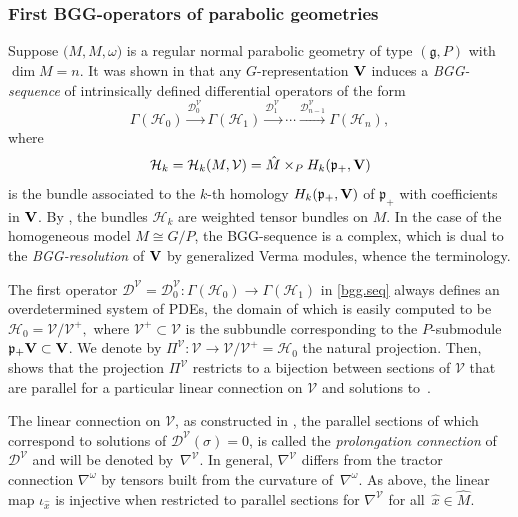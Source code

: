 \documentclass[10pt,a4paper]{amsart}
\numberwithin{equation}{section}
\theoremstyle{definition}
\newcommand{\cV}{{\mathcal V}}
\def\g{{\mathfrak g}}
\def\p{{\mathfrak p}}
\begin{document}
\subsubsection{First BGG-operators of parabolic geometries}\label{sec_BGG}
Suppose $\bigl(M,\hat{M},\omega\bigr)$ is a regular normal parabolic geometry of type $(\g,P)$ with $\dim M=n$. It was shown in \cite{CD.BGG, css.bgg.seqs} that any $G$-representation ${\bf V}$ induces a \emph{BGG-sequence}
of intrinsically defined differential operators of the form
\begin{equation}\label{bgg.seq}
 \Gamma(\mathcal H_0)\stackrel{\mathcal D^{\mathcal V}_0\ }{\rightarrow}\Gamma(\mathcal H_1)\overset{\mathcal D^{\mathcal V}_1\ }{\rightarrow}\cdots
 \overset{\mathcal D^{\mathcal V}_{n-1}}{\rightarrow}\Gamma(\mathcal H_{n}),
 \end{equation}
 where \[\mathcal H_k = \mathcal H_k(M,\mathcal V)=\hat{M}\times_P H_k(\p_+,{\bf V})\] is the bundle associated to the $k$-th homology $H_k(\p_+,{\bf V})$ of $\p_+$ with coefficients in ${\bf V}$. By \cite{kostant.harmonic.curv},
 the bundles $\mathcal H_k$ are weighted tensor bundles on $M$. In the case of the homogeneous model $M \cong G/P$, the BGG-sequence is a complex, which is dual to the \emph{BGG-resolution} of ${\bf V}$ by generalized Verma modules, whence the terminology.

 The first operator $\mathcal D^{\mathcal V} =\mathcal D^{\mathcal V}_0\colon \Gamma(\mathcal H_0)\rightarrow \Gamma(\mathcal H_1)$ in \eqref{bgg.seq} always defines an overdetermined system of PDEs, the
 domain of which is easily computed to be $\mathcal H_0=\mathcal V/\mathcal V^+,$ where $\mathcal V^+ \subset \mathcal V$ is the subbundle corresponding to the $P$-submodule $\p_+{\bf V} \subset {\bf V}$.
 We denote by $\Pi^\mathcal V\colon \mathcal V\rightarrow \mathcal V/\mathcal V^+=\mathcal H_0$ the natural projection. Then, \cite{hsss.prol.connxn, neuss.prolong} shows that the projection $\Pi^\mathcal V$ restricts to a bijection between
 sections of $\mathcal V$ that are parallel for a particular linear connection on $\cV$ and solutions to~.

 The linear connection on $\mathcal V$, as constructed in \cite{hsss.prol.connxn}, the parallel sections of which correspond to solutions of $\mathcal D^{\mathcal V}(\sigma)=0$, is called the \emph{prolongation connection} of $\mathcal D^{\mathcal V}$ and will be denoted by~$\nabla^\mathcal V$. In general, $\nabla^\mathcal V$ differs from the tractor connection $\nabla^\omega$ by tensors built from the curvature of~$\nabla^\omega$. As above, the linear map $\iota_{\hat{x}}$ is injective when restricted to parallel sections for $\nabla^{\mathcal{V}}$ for all~${\hat{x} \in \hat{M}}$.
\end{document}
